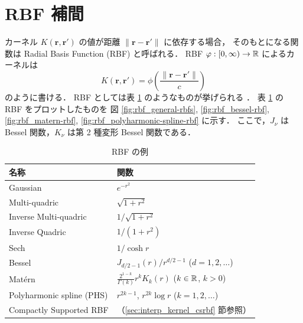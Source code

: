 %

\section{RBF 補間}\label{sec:interp_kernel_rbf}

カーネル $K(\bm{r}, \bm{r}')$ の値が距離 $\|\bm{r} - \bm{r}'\|$ に依存する場合，
そのもとになる関数は Radial Basis Function (RBF) と呼ばれる．
RBF $\varphi : [0, \infty) \to \mathbb{R}$ によるカーネルは
\begin{equation}
    K(\bm{r}, \bm{r}') = \phi\left(\frac{\|\bm{r} - \bm{r}'\|}{c}\right)
    \label{eq:regularization_kernel_kernel-of-rbf}
\end{equation}
のように書ける．
RBF としては表 \ref{table:interp_kernel_example-rbfs} のようなものが挙げられる%
\cite{Fasshauer2007,Brochu2010,Fornberg2015}．
表 \ref{table:interp_kernel_example-rbfs} の RBF をプロットしたものを
図 \ref{fig:rbf_general-rbfs}, \ref{fig:rbf_bessel-rbf}, \ref{fig:rbf_matern-rbf}, \ref{fig:rbf_polyharmonic-spline-rbf} に示す．
ここで，$J_{\nu}$ は Bessel 関数，$K_{\nu}$ は第 2 種変形 Bessel 関数である．

\begin{table}[bp]
    \caption{RBF の例 \cite{Fasshauer2007,Brochu2010,Fornberg2015}}
    \label{table:interp_kernel_example-rbfs}
    \centering
    \begin{tabular}{ll}
        名称                        & 関数                                                              \\
        \hline
        Gaussian                  & $e^{-r^2}$                                                      \\
        Multi-quadric             & $\sqrt{1 + r^2}$                                                \\
        Inverse Multi-quadric     & $1/\sqrt{1 + r^2}$                                              \\
        Inverse Quadric           & $1 / (1 + r^2)$                                                 \\
        Sech                      & $1 / \cosh{r}$                                                  \\
        Bessel                    & $J_{d/2-1}(r) / r^{d/2-1}$ ($d=1,2,\ldots$)                     \\
        Matérn                    & $\frac{2^{1-k}}{\Gamma(k)} r^k K_k(r)$ ($k \in \mathbb{R}$, $k > 0$) \\
        Polyharmonic spline (PHS) & $r^{2k-1}$, $r^{2k}\log{r}$ ($k=1,2,\ldots$)                    \\
        Compactly Supported RBF   & （\ref{sec:interp_kernel_csrbf} 節参照）
    \end{tabular}
\end{table}

